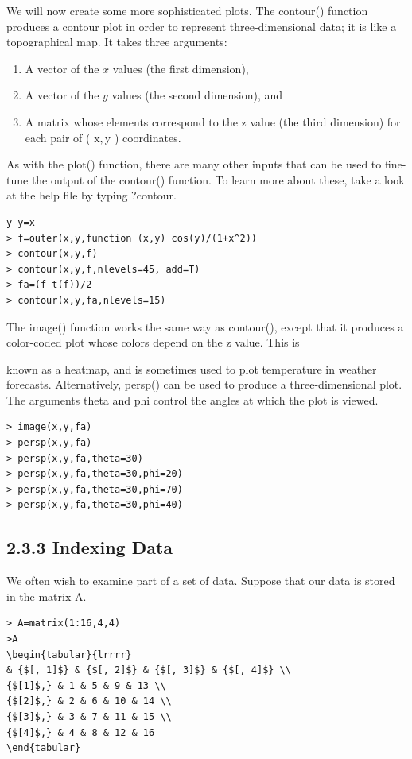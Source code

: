 \documentclass[10pt]{article}
\begin{document}
We will now create some more sophisticated plots. The contour() function produces a contour plot in order to represent three-dimensional data; it is like a topographical map. It takes three arguments:

\begin{enumerate}
  \item A vector of the $x$ values (the first dimension),
  \item A vector of the $y$ values (the second dimension), and
  \item A matrix whose elements correspond to the z value (the third dimension) for each pair of ( $\mathrm{x}, \mathrm{y}$ ) coordinates.
\end{enumerate}

As with the plot() function, there are many other inputs that can be used to fine-tune the output of the contour() function. To learn more about these, take a look at the help file by typing ?contour.

\begin{verbatim}
y y=x
> f=outer(x,y,function (x,y) cos(y)/(1+x^2))
> contour(x,y,f)
> contour(x,y,f,nlevels=45, add=T)
> fa=(f-t(f))/2
> contour(x,y,fa,nlevels=15)
\end{verbatim}

The image() function works the same way as contour(), except that it produces a color-coded plot whose colors depend on the z value. This is

known as a heatmap, and is sometimes used to plot temperature in weather forecasts. Alternatively, persp() can be used to produce a three-dimensional plot. The arguments theta and phi control the angles at which the plot is viewed.

\begin{verbatim}
> image(x,y,fa)
> persp(x,y,fa)
> persp(x,y,fa,theta=30)
> persp(x,y,fa,theta=30,phi=20)
> persp(x,y,fa,theta=30,phi=70)
> persp(x,y,fa,theta=30,phi=40)
\end{verbatim}

\subsection*{2.3.3 Indexing Data}
We often wish to examine part of a set of data. Suppose that our data is stored in the matrix A.

\begin{verbatim}
> A=matrix(1:16,4,4)
>A
\begin{tabular}{lrrrr} 
& {$[, 1]$} & {$[, 2]$} & {$[, 3]$} & {$[, 4]$} \\
{$[1]$,} & 1 & 5 & 9 & 13 \\
{$[2]$,} & 2 & 6 & 10 & 14 \\
{$[3]$,} & 3 & 7 & 11 & 15 \\
{$[4]$,} & 4 & 8 & 12 & 16
\end{tabular}
\end{verbatim}
\end{document}
